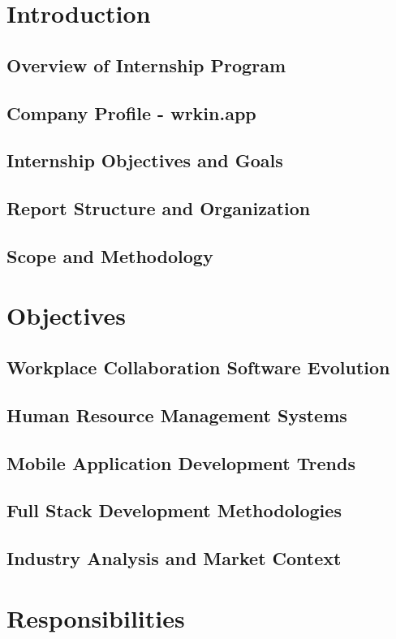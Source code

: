 \documentclass[a4paper, 11pt, oneside]{report}
\begin{document}
\chapter{Introduction}
  \section{Overview of Internship Program}
  \section{Company Profile - wrkin.app}
  \section{Internship Objectives and Goals}
  \section{Report Structure and Organization}
  \section{Scope and Methodology}
  

\chapter{Objectives}
  \section{Workplace Collaboration Software Evolution}
  \section{Human Resource Management Systems}
  \section{Mobile Application Development Trends}
  \section{Full Stack Development Methodologies}
  \section{Industry Analysis and Market Context}
  

\chapter{Responsibilities}
\end{document}
